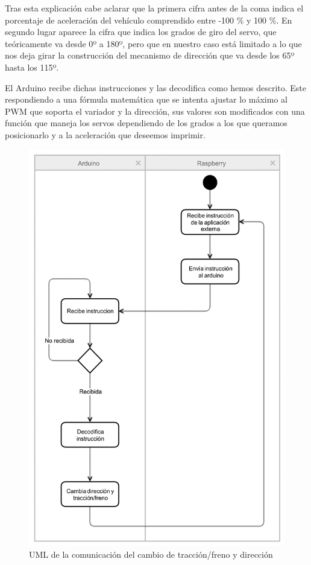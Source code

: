 \documentclass{pclass}
\begin{document}
\begin{itemize}
\begin{itemize}
	Tras esta explicación cabe aclarar que la primera cifra antes de la coma indica el porcentaje de aceleración del vehículo comprendido entre -100 \% y 100 \%. En segundo lugar aparece la cifra que indica los grados de giro del servo, que teóricamente va desde 0º a 180º, pero que en nuestro caso está limitado a lo que nos deja girar la construcción del mecanismo de dirección que va desde los 65º hasta los 115º.
	

	El Arduino recibe dichas instrucciones y las decodifica como hemos descrito. Este respondiendo a una fórmula matemática que se intenta ajustar lo máximo al PWM que soporta el variador y la dirección, sus valores son modificados con una función que maneja los servos dependiendo de los grados a los que queramos posicionarlo y a la aceleración que deseemos imprimir.
	
	\begin{figure}[H]
		\centering
		\includegraphics[width=1\textwidth]{img/umlCambio}
		\caption{UML de la comunicación del cambio de tracción/freno y dirección}
		\label{fig:arduinoCambios}
	\end{figure}
	

\end{itemize}
\end{itemize}
\end{document}
